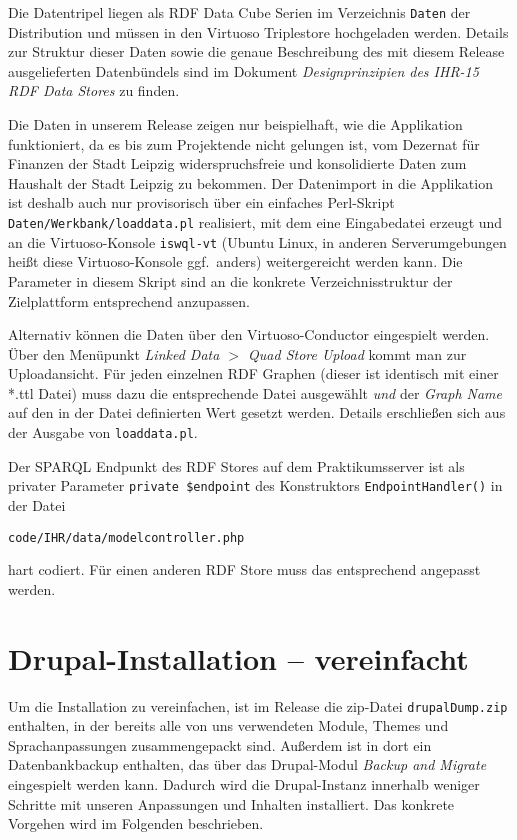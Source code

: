 \documentclass[a4paper,11pt,twoside]{article}
\begin{document}
Die Datentripel liegen als RDF Data Cube Serien im Verzeichnis \texttt{Daten}
der Distribution und müssen in den Virtuoso Triplestore hochgeladen werden.
Details zur Struktur dieser Daten sowie die genaue Beschreibung des mit diesem
Release ausgelieferten Datenbündels sind im Dokument \emph{Designprinzipien des
  IHR-15 RDF Data Stores} zu finden.

Die Daten in unserem Release zeigen nur beispielhaft, wie die Applikation
funktioniert, da es bis zum Projektende nicht gelungen ist, vom Dezernat für
Finanzen der Stadt Leipzig widerspruchsfreie und konsolidierte Daten zum
Haushalt der Stadt Leipzig zu bekommen. Der Datenimport in die Applikation ist
deshalb auch nur provisorisch über ein einfaches Perl-Skript
\texttt{Daten/Werkbank/loaddata.pl} realisiert, mit dem eine Eingabedatei
erzeugt und an die Virtuoso-Konsole \texttt{iswql-vt} (Ubuntu Linux, in anderen
Serverumgebungen heißt diese Virtuoso-Konsole ggf.\ anders) weitergereicht
werden kann.  Die Parameter in diesem Skript sind an die konkrete
Verzeichnisstruktur der Zielplattform entsprechend anzupassen.

Alternativ können die Daten über den Virtuoso-Conductor eingespielt werden.
Über den Menüpunkt \textit{Linked Data $>$ Quad Store Upload} kommt man zur
Uploadansicht.  Für jeden einzelnen RDF Graphen (dieser ist identisch mit einer
*.ttl Datei) muss dazu die entsprechende Datei ausgewählt \emph{und} der
\textit{Graph Name} auf den in der Datei definierten Wert gesetzt werden.
Details erschließen sich aus der Ausgabe von \texttt{loaddata.pl}.

Der SPARQL Endpunkt des RDF Stores auf dem Praktikumsserver ist als privater
Parameter \texttt{private \$endpoint} des Konstruktors
\texttt{EndpointHandler()} in der Datei
\begin{center}
  \texttt{code/IHR/data/modelcontroller.php}
\end{center}
hart codiert.  Für einen anderen RDF Store muss das entsprechend angepasst
werden.
\newpage

\section{Drupal-Installation -- vereinfacht}
Um die Installation zu vereinfachen, ist im Release die zip-Datei
\texttt{drupalDump.zip} enthalten, in der bereits alle von uns verwendeten
Module, Themes und Sprachanpassungen zusammengepackt sind. Außerdem ist in dort
ein Datenbankbackup enthalten, das über das Drupal-Modul \emph{Backup and
  Migrate} eingespielt werden kann.  Dadurch wird die Drupal-Instanz innerhalb
weniger Schritte mit unseren Anpassungen und Inhalten installiert. Das konkrete
Vorgehen wird im Folgenden beschrieben.
\end{document}
